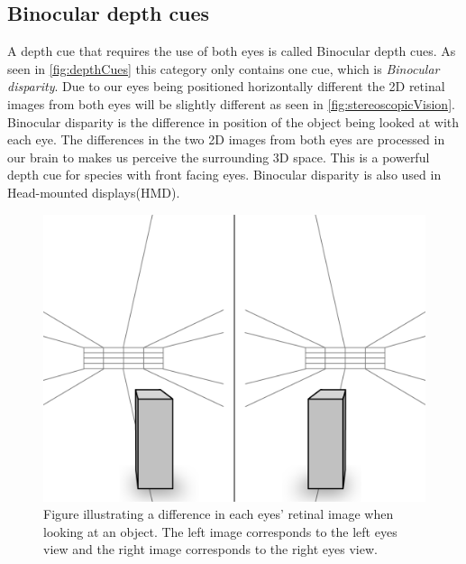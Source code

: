 \subsection{Binocular depth cues}\label{sec:binocularDepthCues}
A depth cue that requires the use of both eyes is called Binocular depth cues. As seen in \autoref{fig:depthCues} this category only contains one cue, which is \textit{Binocular disparity}. Due to our eyes being positioned horizontally different the 2D retinal images from both eyes will be slightly different as seen in \autoref{fig:stereoscopicVision}. Binocular disparity is the difference in position of the object being looked at with each eye\citep{sensationPerception}. The differences in the two 2D images from both eyes are processed in our brain to makes us perceive the surrounding 3D space. This is a powerful depth cue for species with front facing eyes\citep{seeingInThreeDimensions}. Binocular disparity is also used in Head-mounted displays(HMD)\citep{hmdCues}.
\begin{figure}[H]
	\centering
	\includegraphics[width=0.8\linewidth]{figure/Analysis/stereoScopicVision.png}
	\caption{Figure illustrating a difference in each eyes' retinal image when looking at an object. The left image corresponds to the left eyes view and the right image corresponds to the right eyes view.}
	\label{fig:stereoscopicVision}
\end{figure}


